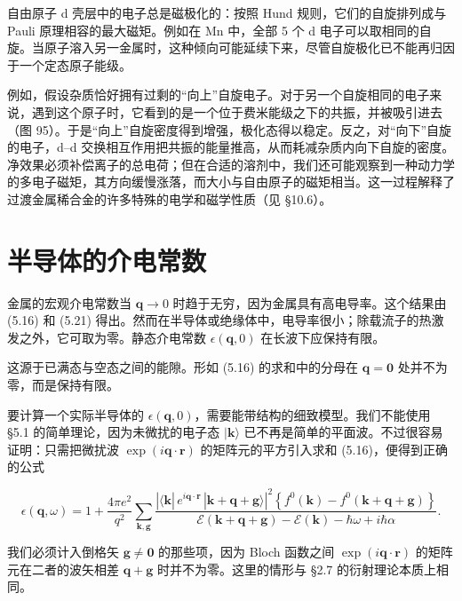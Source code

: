 自由原子 d 壳层中的电子总是磁极化的：按照 Hund 规则，它们的自旋排列成与 Pauli 原理相容的最大磁矩。例如在 Mn 中，全部 5 个 d 电子可以取相同的自旋。当原子溶入另一金属时，这种倾向可能延续下来，尽管自旋极化已不能再归因于一个定态原子能级。

例如，假设杂质恰好拥有过剩的“向上”自旋电子。对于另一个自旋相同的电子来说，遇到这个原子时，它看到的是一个位于费米能级之下的共振，并被吸引进去（图 95）。于是“向上”自旋密度得到增强，极化态得以稳定。反之，对“向下”自旋的电子，d--d 交换相互作用把共振的能量推高，从而耗减杂质内向下自旋的密度。净效果必须补偿离子的总电荷；但在合适的溶剂中，我们还可能观察到一种动力学的多电子磁矩，其方向缓慢涨落，而大小与自由原子的磁矩相当。这一过程解释了过渡金属稀合金的许多特殊的电学和磁学性质（见 §10.6）。


\section{半导体的介电常数}

金属的宏观介电常数当 $\mathbf{q} \to 0$ 时趋于无穷，因为金属具有高电导率。这个结果由 (5.16) 和 (5.21) 得出。然而在半导体或绝缘体中，电导率很小；除载流子的热激发之外，它可取为零。静态介电常数 $\epsilon(\mathbf{q},0)$ 在长波下应保持有限。

这源于已满态与空态之间的能隙。形如 (5.16) 的求和中的分母在 $\mathbf{q} = \mathbf{0}$ 处并不为零，而是保持有限。

要计算一个实际半导体的 $\epsilon(\mathbf{q},0)$，需要能带结构的细致模型。我们不能使用 §5.1 的简单理论，因为未微扰的电子态 $|\mathbf{k}\rangle$ 已不再是简单的平面波。不过很容易证明：只需把微扰波 $\exp(i\mathbf{q}\cdot\mathbf{r})$ 的矩阵元的平方引入求和 (5.16)，便得到正确的公式

\begin{equation*}
\epsilon(\mathbf{q},\omega) = 1 + \frac{4\pi e^2}{q^2} \sum_{\mathbf{k},\mathbf{g}} \frac{\left| \langle \mathbf{k}|\, e^{i\mathbf{q}\cdot\mathbf{r}}\, |\mathbf{k}+\mathbf{q}+\mathbf{g}\rangle \right|^2 \left\{ f^0(\mathbf{k}) - f^0(\mathbf{k}+\mathbf{q}+\mathbf{g}) \right\}}{\mathcal{E}(\mathbf{k}+\mathbf{q}+\mathbf{g}) - \mathcal{E}(\mathbf{k}) - \hbar\omega + i\hbar\alpha} .
\tag{5.45}
\end{equation*}

我们必须计入倒格矢 $\mathbf{g} \neq \mathbf{0}$ 的那些项，因为 Bloch 函数之间 $\exp(i\mathbf{q}\cdot\mathbf{r})$ 的矩阵元在二者的波矢相差 $\mathbf{q}+\mathbf{g}$ 时并不为零。这里的情形与 §2.7 的衍射理论本质上相同。

